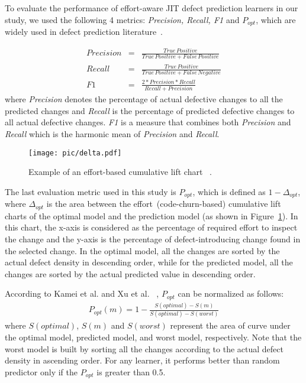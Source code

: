 \documentclass[sigconf]{acmart}
\theoremstyle{break}
\newcommand{\fig}[1]{Figure~\ref{fig:#1}}
\begin{document}
To evaluate the performance of effort-aware JIT defect
prediction learners in our study, 
we used the following 4 metrics: {\it Precision, Recall, F1} and $P_{opt}$,
which are widely used in defect prediction literature~\cite{menzies2007data,menzies2010defect,zimmermann2007predicting, kamei2013large,yang2016effort,monden2013assessing}.



\begin{eqnarray}\nonumber
Precision &=& \frac{True \, Positive}{True \, Positive +False \, Positive}\\ \nonumber
Recall &=& \frac{True \, Positive}{True \, Positive +False \, Negative}\\ \nonumber
F1 &=& \frac{2*Precision*Recall}{Recall + Precision}
\end{eqnarray}
where {\it Precision} denotes the percentage of actual defective changes to all the predicted changes and {\it Recall} is the percentage of predicted defective changes to all actual defective changes. {\it F1 } is a measure that combines both {\it Precision} and {\it Recall} which is the harmonic mean of {\it Precision} and {\it Recall}. 

\begin{figure}[!tph]
    \centering
    \texttt{[image: pic/delta.pdf]}
    \caption{Example of an effort-based cumulative lift chart ~\cite{yang2016effort}.}
    \label{fig:delta}
\end{figure}






The last evaluation metric used in this study is $P_{opt}$,
which is defined as $1- \Delta_{opt}$, where $\Delta_{opt}$ is the area
between the effort~(code-churn-based) cumulative lift charts of the optimal
model and the prediction model (as shown in \fig{delta}). 
In this chart, the x-axis is considered as the percentage of required effort to inspect the change and the y-axis
is the percentage of defect-introducing change found in the selected change. In the optimal model, all the changes are sorted by the actual defect density in descending order, while for the predicted model, all the changes are sorted by 
the actual predicted value in  descending order.

According to Kamei et al. and Xu et al. ~\cite{yang2016effort,kamei2013large,monden2013assessing}, $P_{opt}$ can be normalized as follows:
\begin{eqnarray} \nonumber
P_{opt}(m) = 1- \frac{S(optimal)-S(m)}{S(optimal)-S(worst)}
\end{eqnarray}
where $S(optimal)$, $S(m)$ and $S(worst)$ represent the area of curve under the optimal model, predicted model, and worst model, respectively. Note that the worst model is built by sorting all the changes according to the actual defect density in ascending order. For any learner, it performs better than random predictor only if the ${P_{opt}}$ is greater than 0.5.
\end{document}
